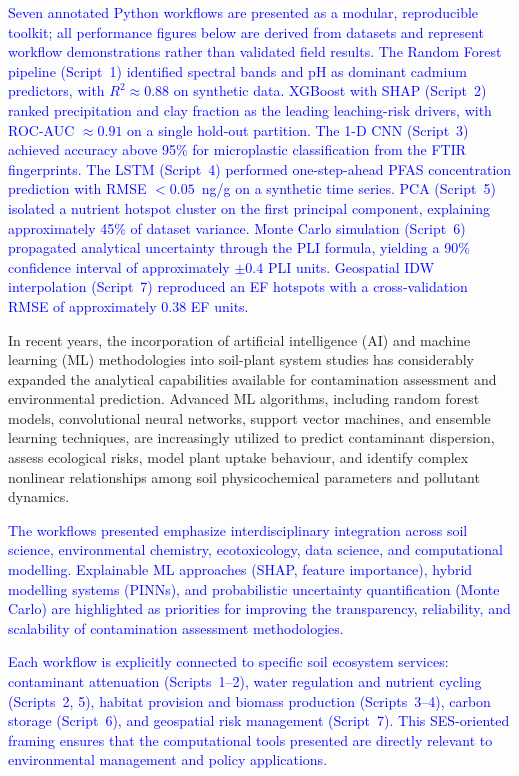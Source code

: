 \documentclass[environments,article,submit,pdftex,moreauthors]{Definitions/mdpi}
\begin{document}
\textcolor{blue}{Seven annotated Python workflows are presented as a modular, reproducible toolkit; all performance figures below are derived from datasets and represent workflow demonstrations rather than validated field results. The Random Forest pipeline (Script~1) identified spectral bands and pH as dominant cadmium predictors, with $R^2 \approx 0.88$ on synthetic data. XGBoost with SHAP (Script~2) ranked precipitation and clay fraction as the leading leaching-risk drivers, with ROC-AUC $\approx 0.91$ on a single hold-out partition. The 1-D CNN (Script~3) achieved accuracy above 95\% for microplastic classification from the FTIR fingerprints. The LSTM (Script~4) performed one-step-ahead PFAS concentration prediction with RMSE $< 0.05$~ng/g on a synthetic time series. PCA (Script~5) isolated a nutrient hotspot cluster on the first principal component, explaining approximately 45\% of dataset variance. Monte Carlo simulation (Script~6) propagated analytical uncertainty through the PLI formula, yielding a 90\% confidence interval of approximately $\pm 0.4$ PLI units. Geospatial IDW interpolation (Script~7) reproduced an EF hotspots with a cross-validation RMSE of approximately 0.38 EF units.}

In recent years, the incorporation of artificial intelligence (AI) and machine
learning (ML) methodologies into soil-plant system studies has considerably
expanded the analytical capabilities available for contamination assessment
and environmental prediction. Advanced ML algorithms, including random forest
models, convolutional neural networks, support vector machines, and ensemble
learning techniques, are increasingly utilized to predict contaminant
dispersion, assess ecological risks, model plant uptake behaviour, and identify
complex nonlinear relationships among soil physicochemical parameters and
pollutant dynamics.

\textcolor{blue}{The workflows presented emphasize interdisciplinary integration across soil science, environmental chemistry, ecotoxicology, data science, and computational modelling. Explainable ML approaches (SHAP, feature importance), hybrid modelling systems (PINNs), and probabilistic uncertainty quantification (Monte Carlo) are highlighted as priorities for improving the transparency, reliability, and scalability of contamination assessment methodologies.}

\textcolor{blue}{Each workflow is explicitly connected to specific soil ecosystem services: contaminant attenuation (Scripts~1--2), water regulation and nutrient cycling (Scripts~2, 5), habitat provision and biomass production (Scripts~3--4), carbon storage (Script~6), and geospatial risk management (Script~7). This SES-oriented framing ensures that the computational tools presented are directly relevant to environmental management and policy applications.}
\end{document}
